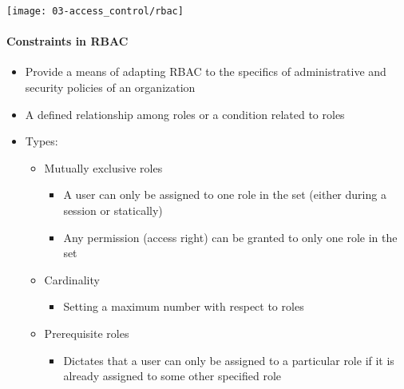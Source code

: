 \begin{center}
    \texttt{[image: 03-access\_control/rbac]}
    \vspace{-8pt}
\end{center}

\paragraph{Constraints in RBAC}
\begin{itemize}
    \item Provide a means of adapting RBAC to the specifics of administrative and security policies of an organization
    \item A defined relationship among roles or a condition related to roles
    \item Types:
    \begin{itemize}
        \item Mutually exclusive roles
        \begin{itemize}
            \item A user can only be assigned to one role in the set (either during a session or statically)
            \item Any permission (access right) can be granted to only one role in the set
        \end{itemize}
        \item Cardinality
        \begin{itemize}
            \item Setting a maximum number with respect to roles
        \end{itemize}
        \item Prerequisite roles
        \begin{itemize}
            \item Dictates that a user can only be assigned to a particular role if it is already assigned to some other specified role
        \end{itemize}
    \end{itemize}
\end{itemize}

